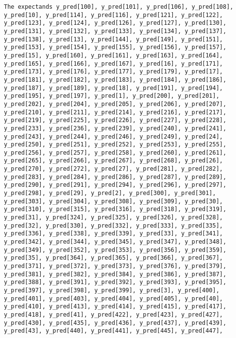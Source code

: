 \documentclass[
  letterpaper,
  DIV=11,
  numbers=noendperiod]{scrartcl}
\begin{document}
\begin{verbatim}
The expectands y_pred[100], y_pred[101], y_pred[106], y_pred[108],
y_pred[10], y_pred[114], y_pred[116], y_pred[121], y_pred[122],
y_pred[123], y_pred[124], y_pred[126], y_pred[127], y_pred[130],
y_pred[131], y_pred[132], y_pred[133], y_pred[134], y_pred[137],
y_pred[138], y_pred[13], y_pred[144], y_pred[149], y_pred[151],
y_pred[153], y_pred[154], y_pred[155], y_pred[156], y_pred[157],
y_pred[15], y_pred[160], y_pred[161], y_pred[163], y_pred[164],
y_pred[165], y_pred[166], y_pred[167], y_pred[16], y_pred[171],
y_pred[173], y_pred[176], y_pred[177], y_pred[179], y_pred[17],
y_pred[181], y_pred[182], y_pred[183], y_pred[184], y_pred[186],
y_pred[187], y_pred[189], y_pred[18], y_pred[191], y_pred[194],
y_pred[195], y_pred[197], y_pred[1], y_pred[200], y_pred[201],
y_pred[202], y_pred[204], y_pred[205], y_pred[206], y_pred[207],
y_pred[210], y_pred[211], y_pred[214], y_pred[216], y_pred[217],
y_pred[219], y_pred[225], y_pred[226], y_pred[227], y_pred[228],
y_pred[233], y_pred[236], y_pred[239], y_pred[240], y_pred[241],
y_pred[243], y_pred[244], y_pred[246], y_pred[249], y_pred[24],
y_pred[250], y_pred[251], y_pred[252], y_pred[253], y_pred[255],
y_pred[256], y_pred[257], y_pred[258], y_pred[260], y_pred[261],
y_pred[265], y_pred[266], y_pred[267], y_pred[268], y_pred[26],
y_pred[270], y_pred[272], y_pred[27], y_pred[281], y_pred[282],
y_pred[283], y_pred[284], y_pred[286], y_pred[287], y_pred[289],
y_pred[290], y_pred[291], y_pred[294], y_pred[296], y_pred[297],
y_pred[298], y_pred[29], y_pred[2], y_pred[300], y_pred[301],
y_pred[303], y_pred[304], y_pred[308], y_pred[309], y_pred[30],
y_pred[310], y_pred[315], y_pred[316], y_pred[318], y_pred[319],
y_pred[31], y_pred[324], y_pred[325], y_pred[326], y_pred[328],
y_pred[32], y_pred[330], y_pred[332], y_pred[333], y_pred[335],
y_pred[336], y_pred[338], y_pred[339], y_pred[33], y_pred[341],
y_pred[342], y_pred[344], y_pred[345], y_pred[347], y_pred[348],
y_pred[349], y_pred[352], y_pred[353], y_pred[356], y_pred[359],
y_pred[35], y_pred[364], y_pred[365], y_pred[366], y_pred[367],
y_pred[371], y_pred[372], y_pred[373], y_pred[376], y_pred[379],
y_pred[381], y_pred[382], y_pred[384], y_pred[386], y_pred[387],
y_pred[388], y_pred[391], y_pred[392], y_pred[393], y_pred[395],
y_pred[397], y_pred[398], y_pred[399], y_pred[3], y_pred[400],
y_pred[401], y_pred[403], y_pred[404], y_pred[405], y_pred[40],
y_pred[410], y_pred[413], y_pred[414], y_pred[415], y_pred[417],
y_pred[418], y_pred[41], y_pred[422], y_pred[423], y_pred[427],
y_pred[430], y_pred[435], y_pred[436], y_pred[437], y_pred[439],
y_pred[43], y_pred[440], y_pred[441], y_pred[445], y_pred[447],

\end{verbatim}
\end{document}

